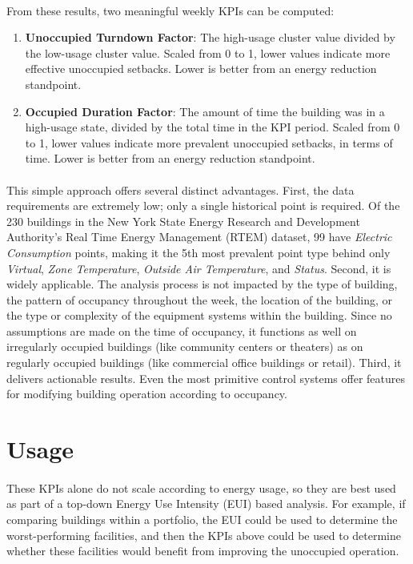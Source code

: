 \documentclass[a4paper]{article}
\begin{document}
\paragraph{}
From these results, two meaningful weekly KPIs can be computed:
\begin{enumerate}
\item{\textbf{Unoccupied Turndown Factor}: The high-usage cluster value divided by the low-usage cluster value. Scaled from 0 to 1, lower values indicate more effective unoccupied setbacks. Lower is better from an energy reduction standpoint.}
\item{\textbf{Occupied Duration Factor}: The amount of time the building was in a high-usage state, divided by the total time in the KPI period. Scaled from 0 to 1, lower values indicate more prevalent unoccupied setbacks, in terms of time.  Lower is better from an energy reduction standpoint.}
\end{enumerate}

\paragraph{}
This simple approach offers several distinct advantages. First, the data requirements are extremely low; only a single historical point is required. Of the 230 buildings in the New York State Energy Research and Development Authority's Real Time Energy Management (RTEM) dataset, 99 have \textit{Electric Consumption} points, making it the 5th most prevalent point type behind only  \textit{Virtual}, \textit{Zone Temperature}, \textit{Outside Air Temperature}, and \textit{Status}. Second, it is widely applicable. The analysis process is not impacted by the type of building, the pattern of occupancy throughout the week, the location of the building, or the type or complexity of the equipment systems within the building. Since no assumptions are made on the time of occupancy, it functions as well on irregularly occupied buildings (like community centers or theaters) as on regularly occupied buildings (like commercial office buildings or retail). Third, it delivers actionable results. Even the most primitive control systems offer features for modifying building operation according to occupancy.

\section{Usage}

\paragraph{}
These KPIs alone do not scale according to energy usage, so they are best used as part of a top-down Energy Use Intensity (EUI) based analysis. For example, if comparing buildings within a portfolio, the EUI could be used to determine the worst-performing facilities, and then the KPIs above could be used to determine whether these facilities would benefit from improving the unoccupied operation.
\end{document}
